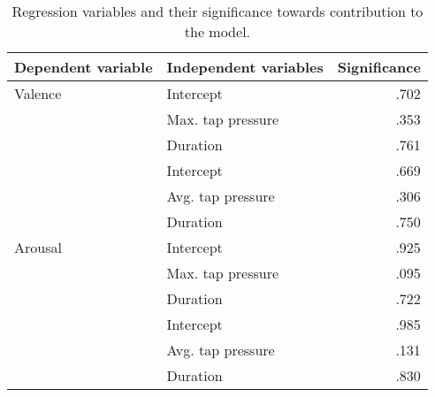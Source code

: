 \begin{table}[ht]
\centering
\begin{tabular}{@{}llr@{}}
\textbf{Dependent variable} & \textbf{Independent variables} & \textbf{Significance} \\ \midrule
Valence                     & Intercept                       & .702                  \\
                            & Max. tap pressure               & .353                  \\
                            & Duration                        & .761                  \\ \cmidrule(l){2-3} 
                            & Intercept                       & .669                  \\
                            & Avg. tap pressure               & .306                  \\
                            & Duration                        & .750                  \\ \midrule
Arousal                     & Intercept                       & .925                  \\
                            & Max. tap pressure               & .095                  \\
                            & Duration                        & .722                  \\ \cmidrule(l){2-3} 
                            & Intercept                       & .985                  \\
                            & Avg. tap pressure               & .131                  \\
                            & Duration                        & .830                 
\end{tabular}
\caption{Regression variables and their significance towards contribution to the model.}
\label{tab:regression_significance}
\end{table}